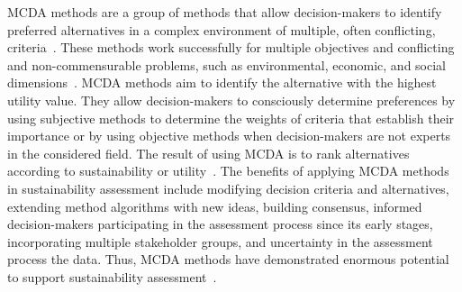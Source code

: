 \documentclass[final,5p,times,twocolumn,authoryear]{elsarticle}
\begin{document}
MCDA methods are a group of methods that allow decision-makers to identify preferred alternatives in a complex environment of multiple, often conflicting, criteria~\citep{zheng2016scenario}. These methods work successfully for multiple objectives and conflicting and non-commensurable problems, such as environmental, economic, and social dimensions~\citep{trump2018sustainable}. MCDA methods aim to identify the alternative with the highest utility value. They allow decision-makers to consciously determine preferences by using subjective methods to determine the weights of criteria that establish their importance or by using objective methods when decision-makers are not experts in the considered field. The result of using MCDA is to rank alternatives according to sustainability or utility~\citep{langemeyer2016bridging}. The benefits of applying MCDA methods in sustainability assessment include modifying decision criteria and alternatives, extending method algorithms with new ideas, building consensus, informed decision-makers participating in the assessment process since its early stages, incorporating multiple stakeholder groups, and uncertainty in the assessment process the data. Thus, MCDA methods have demonstrated enormous potential to support sustainability assessment~\citep{myllyviita2017sustainability}.
\end{document}
